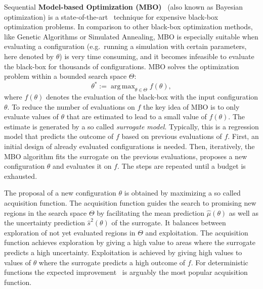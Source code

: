 \documentclass[bimj,fleqn]{w-art}
\theoremstyle{plain}
\theoremstyle{definition}
\begin{document}
Sequential \textbf{Model-based Optimization (MBO)}~\citep{jones_taxonomy_2001} (also known as Bayesian optimization) is a state-of-the-art~\citep{shahriari_taking_2016} technique for expensive black-box optimization problems.
In comparison to other black-box optimization methods, like Genetic Algorithms or Simulated Annealing, MBO is especially suitable when evaluating a configuration (e.g.\ running a simulation with certain parameters, here denoted by $\theta$) is very time consuming, and it becomes infeasible to evaluate the black-box for thousands of configurations.
MBO solves the optimization problem within a bounded search space $\Theta$:
\[
\theta^\ast := \operatorname{arg\,max}_{\theta \in \Theta} f(\theta),
\]
where $f(\theta)$ denotes the evaluation of the black-box with the input configuration $\theta$.
To reduce the number of evaluations on $f$ the key idea of MBO is to only evaluate values of $\theta$ that are estimated to lead to a small value of $f(\theta)$.
The estimate is generated by a so called \emph{surrogate model}.
Typically, this is a regression model that predicts the outcome of $f$ based on previous evaluations of $f$.
First, an initial design of already evaluated configurations is needed.
Then, iteratively, the MBO algorithm fits the surrogate on the previous evaluations, proposes a new configuration $\theta$ and evaluates it on $f$.
The steps are repeated until a budget is exhausted.

The proposal of a new configuration $\theta$ is obtained by maximizing a so called acquisition function.
The acquisition function guides the search to promising new regions in the search space $\Theta$ by facilitating the mean prediction $\hat{\mu}(\theta)$ as well as the uncertainty prediction $\hat{s}^2(\theta)$ of the surrogate.
It balances between exploration of not yet evaluated regions in $\Theta$ and exploitation.
The acquisition function achieves exploration by giving a high value to areas where the surrogate predicts a high uncertainty.
Exploitation is achieved by giving high values to values of $\theta$ where the surrogate predicts a high outcome of $f$.
For deterministic functions the expected improvement~\citep{jones_efficient_1998} is arguably the most popular acquisition function.
\end{document}
